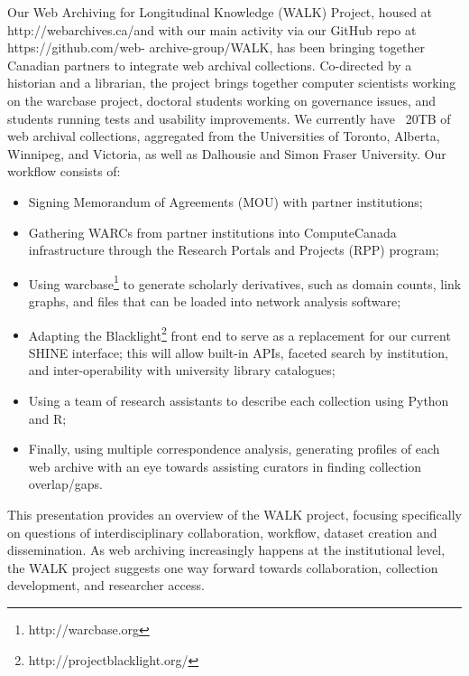 \documentclass[sigconf]{acmart}
\begin{document}
Our Web Archiving for Longitudinal Knowledge (WALK) Project, housed at http://webarchives.ca/and with our main activity via our GitHub repo at https://github.com/web- archive-group/WALK, has been bringing together Canadian partners to integrate web archival collections. Co-directed by a historian and a librarian, the project brings together computer scientists working on the warcbase project, doctoral students working on governance issues, and students running tests and usability improvements. We currently have ~20TB of web archival collections, aggregated from the Universities of Toronto, Alberta, Winnipeg, and Victoria, as well as Dalhousie and Simon Fraser University. Our workflow consists of:
\begin{itemize}
  \item Signing Memorandum of Agreements (MOU) with partner institutions;
  \item Gathering WARCs from partner institutions into ComputeCanada infrastructure through the Research Portals and Projects (RPP) program;
  \item Using warcbase\footnote{http://warcbase.org} to generate scholarly derivatives, such as domain counts, link graphs, and files that can be loaded into network analysis software\cite{lin_etal_2017};
  \item Adapting the Blacklight\footnote{http://projectblacklight.org/} front end to serve as a replacement for our current SHINE interface; this will allow built-in APIs, faceted search by institution, and inter-operability with university library catalogues\cite{jackson_etal_2016};
  \item Using a team of research assistants to describe each collection using Python and R;
  \item Finally, using multiple correspondence analysis, generating profiles of each web archive with an eye towards assisting curators in finding collection overlap/gaps\cite{Milligan_etal_JCDL2016}.\\
\end{itemize}

This presentation provides an overview of the WALK project, focusing specifically on questions of interdisciplinary collaboration, workflow, dataset creation and dissemination. As web archiving increasingly happens at the institutional level, the WALK project suggests one way forward towards collaboration, collection development, and researcher access.


 
\end{document}
